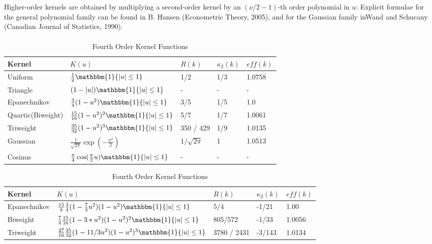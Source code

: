 \documentclass{article}
\newcommand{\ind}{\mathbbm{1}}
\begin{document}
Higher-order kernels are obtained by multiplying a second-order kernel by an $(\nu/2 - 1)$-th order polynomial in $u$: Explicit formulae for the general polynomial family can be found in B. Hansen (Econometric Theory, 2005), and for the Gaussian family inWand and Schucany (Canadian Journal of Statistics, 1990).
\[ \begin{split}
\end{split} \]
\begin{table}[!htbp]
  \begin{center}
  \caption{Kernel Functions}
  \begin{tabular}{lllll}
    \hline    \hline
    Kernel & $K(u)$ & $R(k)$ & $\kappa_2(k)$ & $eff(k)$  \\ \hline
    Uniform & $\frac{1}{2} \ind \{ |u| \le 1 \}$ & 1/2 &  1/3 & 1.0758\\
    Triangle & $(1 - |u|) \ind \{ |u| \le 1 \}$  &- & -& - \\
    Epanechnikov & $\frac{3}{4} (1 - u^2) \ind \{ |u| \le 1 \}$ & 3/5 & 1/5 & 1.0\\
    Quartic(Biweight) & $\frac{15}{16} (1 - u^2)^2 \ind\{ |u| \le 1 \}$ & 5/7 & 1/7 & 1.0061\\
    Triweight & $\frac{35}{32} (1 - u^2)^3 \ind\{ |u| \le 1 \}$ & 350 / 429 & 1/9 & 1.0135 \\
    Gaussian & $\frac{1}{\sqrt{2\pi}} \exp(-\frac{x^2}{2})$ & $1/\sqrt{2\pi}$ & 1 &  1.0513 \\
    Cosinus & $\frac{\pi}{4} \cos(\frac{\pi}{2}u)\ind\{ |u| \le 1 \}$ &-&-&- \\
    \hline
  \end{tabular}

\caption{Fourth Order Kernel Functions}
\begin{tabular}{lllll}
  \hline    \hline
Kernel & $K(u)$ & $R(k)$ & $\kappa_2(k)$ & $eff(k)$  \\ \hline
Epanechnikov & $\frac{15}{8}\frac{3}{4}(1 - \frac{7}{3}u^2)(1-u^2) \ind \{ |u| \le 1 \} $ & $5/4$ & -1/21 & 1.00\\
Biweight & $\frac{7}{4}\frac{15}{16} (1 - 3*u^2) (1 - u^2)^2 \ind\{ |u| \le 1 \} $ & 805/572 & -1/33 & 1.0056 \\
Triweight & $\frac{27}{16} \frac{35}{32} (1 - 11/3 u^2) (1 - u^2)^3 \ind\{ |u| \le 1 \}$  & 3780 / 2431 & -3/143 & 1.0134 \\
  \hline
\end{tabular}
\end{center}

\end{table}
\end{document}
